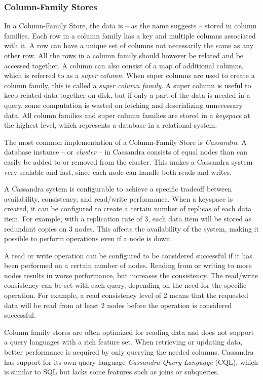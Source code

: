 \subsubsection{Column-Family Stores}

In a Column-Family Store, the data is -- as the name suggests -- stored in column families. Each row in a column family has a key and multiple columns associated with it. A row can have a unique set of columns not necessarily the same as any other row. All the rows in a column family should however be related and be accessed together. A column can also consist of a map of additional columns, which is referred to as a \emph{super column}. When super columns are used to create a column family, this is called a \emph{super column family}. A super column is useful to keep related data together on disk, but if only a part of the data is needed in a query, some computation is wasted on fetching and deserializing unnecessary data. All column families and super column families are stored in a \emph{keyspace} at the highest level, which represents a database in a relational system.

The most common implementation of a Column-Family Store is \emph{Cassandra}. A database instance -- or \emph{cluster} -- in Cassandra consists of equal nodes than can easily be added to or removed from the cluster. This makes a Cassandra system very scalable and fast, since each node can handle both reads and writes.

A Cassandra system is configurable to achieve a specific tradeoff between availability, consistency, and read/write performance. When a keyspace is created, it can be configured to create a certain number of replicas of each data item. For example, with a replication rate of 3, each data item will be stored as redundant copies on 3 nodes. This affects the availability of the system, making it possible to perform operations even if a node is down.

A read or write operation can be configured to be considered successful if it has been performed on a certain number of nodes. Reading from or writing to more nodes results in worse performance, but increases the consistency. The read/write consistency can be set with each query, depending on the need for the specific operation. For example, a read consistency level of 2 means that the requested data will be read from at least 2 nodes before the operation is considered successful.

Column family stores are often optimized for reading data and does not support a query languages with a rich feature set. When retrieving or updating data, better performance is acquired by only querying the needed columns. Cassandra has support for its own query language \emph{Cassandra Query Language} (CQL), which is similar to SQL but lacks some features such as joins or subqueries.
